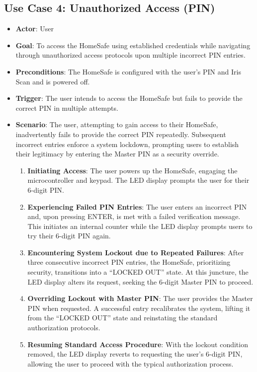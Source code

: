 \documentclass{article}
\begin{document}
\subsection{Use Case 4: Unauthorized Access (PIN)}
\begin{itemize}
    \item \textbf{Actor}: User
    \item \textbf{Goal}: To access the HomeSafe using established credentials while navigating through unauthorized access protocols upon multiple incorrect PIN entries.
    \item \textbf{Preconditions}:  The HomeSafe is configured with the user’s PIN and Iris Scan and is powered off.
    \item \textbf{Trigger}: The user intends to access the HomeSafe but fails to provide the correct PIN in multiple attempts.
    \item \textbf{Scenario}: The user, attempting to gain access to their HomeSafe, inadvertently fails to provide the correct PIN repeatedly. Subsequent incorrect entries enforce a system lockdown, prompting users to establish their legitimacy by entering the Master PIN as a security override.
    \begin{enumerate}
    \item \textbf{Initiating Access}: The user powers up the HomeSafe, engaging the microcontroller and keypad. The LED display prompts the user for their 6-digit PIN.
    \item \textbf{Experiencing Failed PIN Entries}: The user enters an incorrect PIN and, upon pressing ENTER, is met with a failed verification message. This initiates an internal counter while the LED display prompts users to try their 6-digit PIN again.
    \item \textbf{Encountering System Lockout due to Repeated Failures}: After three consecutive incorrect PIN entries, the HomeSafe, prioritizing security, transitions into a “LOCKED OUT” state. At this juncture, the LED display alters its request, seeking the 6-digit Master PIN to proceed.
    \item \textbf{Overriding Lockout with Master PIN}: The user provides the Master PIN when requested. A successful entry recalibrates the system, lifting it from the “LOCKED OUT” state and reinstating the standard authorization protocols.
    \item \textbf{Resuming Standard Access Procedure}: With the lockout condition removed, the LED display reverts to requesting the user’s 6-digit PIN, allowing the user to proceed with the typical authorization process.
    \end{enumerate}
\end{itemize}
\end{document}
